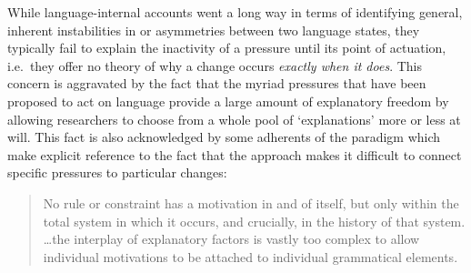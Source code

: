 While language-internal accounts went a long way in terms of identifying general, inherent instabilities in or asymmetries between two language states, they typically fail to explain the inactivity of a pressure until its point of actuation, i.e.~they offer no theory of why a change occurs \emph{exactly when it does}. %
This concern is aggravated by the fact that the myriad pressures that have been proposed to act on language provide a large amount of explanatory freedom by allowing researchers to choose from a whole pool of `explanations' more or less at will. This fact is also acknowledged by some adherents of the paradigm which make explicit reference to the fact that the approach makes it difficult to connect specific pressures to particular changes:

\begin{quote}
No rule or constraint has a motivation in and of itself, but only within the total system in which it occurs, and crucially, in the history of that system. \ldots the interplay of explanatory factors is vastly too complex to allow individual motivations to be attached to individual grammatical elements.~\citep[p.313]{Newmeyer2014}
\end{quote}

